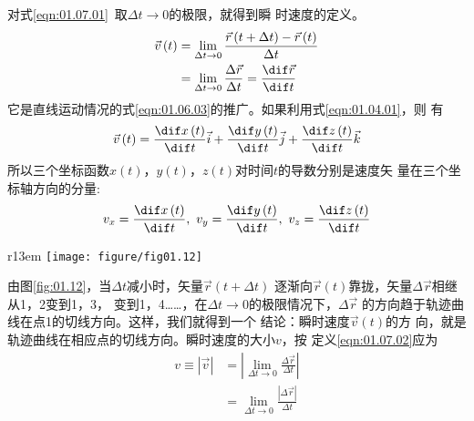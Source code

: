 \documentclass[../outline-of-mechanics.tex]{subfiles}
\begin{document}
对式\eqref{eqn:01.07.01}~取$\Delta t \rightarrow 0$的极限，就得到瞬
时速度的定义。
\begin{equation}\label{eqn:01.07.02}
  \begin{aligned}
    \vec{v}\left(t\right) & =\lim _{\Delta t \rightarrow 0} \frac{\vec{r}\left(t+\Delta t\right)-\vec{r}\left(t\right)}{\Delta t} \\
                          & =\lim _{\Delta t \rightarrow 0} \frac{\Delta \vec{r}}{\Delta t} =\frac{\dif\vec{r}}{\dif t}
  \end{aligned}
\end{equation}
它是直线运动情况的式\eqref{eqn:01.06.03}的推广。如果利用式\eqref{eqn:01.04.01}，则
有
\begin{equation}\label{eqn:01.07.03}
  \vec{v}\left(t\right)=\frac{\dif x\left(t\right)}{\dif t} \vec{i}+\frac{\dif y\left(t\right)}{\dif t} \vec{j}+\frac{\dif z\left(t\right)}{\dif t} \vec{k}
\end{equation}
所以三个坐标函数$x\left(t\right)$，$y\left(t\right)$，$z\left(t\right)$对时间$t$的导数分别是速度矢
量在三个坐标轴方向的分量:
\begin{equation}\label{eqn:01.07.04}
  v_{x}=\frac{\dif x\left(t\right)}{\dif t}, ~ v_{y}=\frac{\dif y\left(t\right)}{\dif t}, ~ v_{z}=\frac{\dif z\left(t\right)}{\dif t}
\end{equation}
\clearpage
\begin{wrapfigure}[7]{r}{13em}
  \centering
  \small
  \texttt{[image: figure/fig01.12]}
  \caption{曲线运动的瞬时速度}
  \label{fig:01.12}
\end{wrapfigure}
由图\ref{fig:01.12}，当$\Delta t$减小时，矢量$\vec{r}\left(t+\Delta t\right)$
逐渐向$\vec{r}\left(t\right)$靠拢，矢量$\Delta \vec{r}$相继从1，2变到1，3，
变到1，4……，在$\Delta t \rightarrow 0$的极限情况下，$\Delta \vec{r}$
的方向趋于轨迹曲线在点1的切线方向。这样，我们就得到一个
结论：瞬时速度$\vec{v}\left(t\right)$的方
向，就是轨迹曲线在相应点的切线方向。瞬时速度的大小$v$，按
定义\eqref{eqn:01.07.02}应为
\setlength{\mathindent}{15em}
\begin{equation*}
  \begin{aligned}
    v\equiv |\vec{v}| & =\left|\lim _{\Delta t \rightarrow 0} \frac{\Delta \vec{r}}{\Delta t}\right| \\
                      & =\lim _{\Delta t \rightarrow 0} \frac{|\Delta \vec{r}|}{\Delta t}
  \end{aligned}
\end{equation*}
\end{document}
